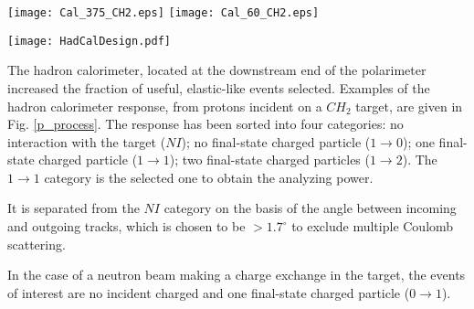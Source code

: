 \documentclass[epj]{svjour}
\begin{document}
\begin{figure*}
\centering
\texttt{[image: Cal\_375\_CH2.eps]}
\texttt{[image: Cal\_60\_CH2.eps]}
\hspace*{-0.1cm}
\caption{Summed calorimeter energy deposit for different processes induced on a $CH_2$ target by protons of  momentum 3.75 GeV/c (left) and 6.0 GeV/c (right).}
\label{p_process}
\end{figure*}

\begin{figure*}
\centering
\texttt{[image: HadCalDesign.pdf]}
\caption{View of the different bars of the hadron calorimeter used in the ALPOM2 set up. The different bar compositions are noted at the side.}
\label{fig:HadCalDesign}
\end{figure*}

The hadron calorimeter, located at the downstream end of the polarimeter increased the fraction of useful, elastic-like events selected. Examples of the hadron calorimeter response, from protons incident on a $CH_2$ target,  are given in Fig. \ref{p_process}. The response has been sorted into four categories: no interaction with the target ($NI$); no final-state charged particle ($1 \to 0$); one final-state charged particle ($1 \to 1$); two final-state charged particles  ($1 \to 2$). The  $1 \to 1$ category is the selected one to obtain the analyzing power.

It is separated from the $NI$ category on the basis of the angle between incoming and outgoing tracks, which is chosen to be $>1.7^\circ$ to exclude multiple Coulomb scattering.

In the case of a neutron beam making a charge exchange in the target, the events of interest are no incident charged and one final-state charged particle ($0 \to 1$).
\end{document}
